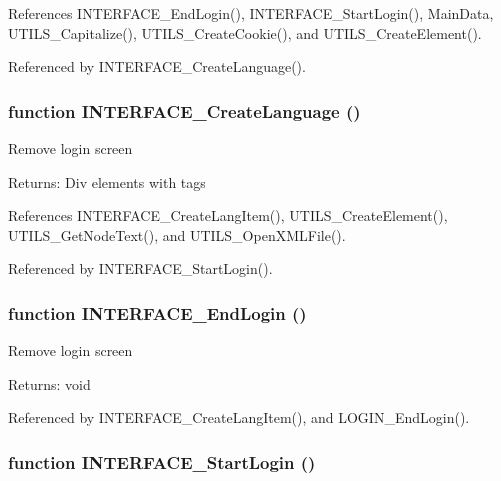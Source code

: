 References INTERFACE\_\-EndLogin(), INTERFACE\_\-StartLogin(), MainData, UTILS\_\-Capitalize(), UTILS\_\-CreateCookie(), and UTILS\_\-CreateElement().

Referenced by INTERFACE\_\-CreateLanguage().
\subsubsection{\setlength{\rightskip}{0pt plus 5cm}function INTERFACE\_\-CreateLanguage ()}\label{interface_2login_8js_279f5cc233f1ef13bd5a2ec50a63254b}


Remove login screen

\begin{Desc}
\item[Returns:]Div elements with tags \end{Desc}


References INTERFACE\_\-CreateLangItem(), UTILS\_\-CreateElement(), UTILS\_\-GetNodeText(), and UTILS\_\-OpenXMLFile().

Referenced by INTERFACE\_\-StartLogin().
\subsubsection{\setlength{\rightskip}{0pt plus 5cm}function INTERFACE\_\-EndLogin ()}\label{interface_2login_8js_3848d3b3123f0fd40ec010833f8f89a8}


Remove login screen

\begin{Desc}
\item[Returns:]void \end{Desc}


Referenced by INTERFACE\_\-CreateLangItem(), and LOGIN\_\-EndLogin().
\subsubsection{\setlength{\rightskip}{0pt plus 5cm}function INTERFACE\_\-StartLogin ()}\label{interface_2login_8js_1eab2aa8ae068c60514e00b76816e747}


